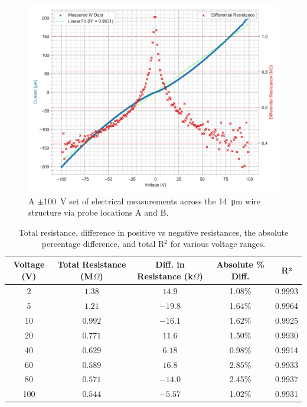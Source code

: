 \begin{refsection}
\begin{figure}[H]
    \centering
    \includegraphics[width=\linewidth]{Chapter7/Figs/Raster/100V AB d.png}
    \caption{A $\pm$100~\si{\volt} set of electrical measurements across the 14~\si{\micro\metre} wire structure via probe locations A and B.}
    \label{fig:100v_ab}
\end{figure}

\begin{table}[ht]
\centering
\begin{tabular}{|c|c|c|c|c|}
\hline
Voltage (V) & Total Resistance (M$\Omega$) & Diff. in Resistance (k$\Omega$) & Absolute \% Diff. & R² \\
\hline
2  & $1.38$ & $14.9$ & 1.08\% & 0.9993 \\
5  & $1.21$ & $-19.8$ & 1.64\% & 0.9964 \\
10 & $0.992$ & $-16.1$ & 1.62\% & 0.9925 \\
20 & $0.771$ & $11.6$ & 1.50\% & 0.9930 \\
40 & $0.629$ & $6.18$ & 0.98\% & 0.9914 \\
60 & $0.589$ & $16.8$ & 2.85\% & 0.9933 \\
80 & $0.571$ & $-14.0$ & 2.45\% & 0.9937 \\
100& $0.544$ & $-5.57$ & 1.02\% & 0.9931 \\
\hline
\end{tabular}
\caption{Total resistance, difference in positive vs negative resistances, the absolute percentage difference, and total R$^{2}$ for various voltage ranges.}
\label{tab:resistance_difference_total}
\end{table}


\end{refsection}
